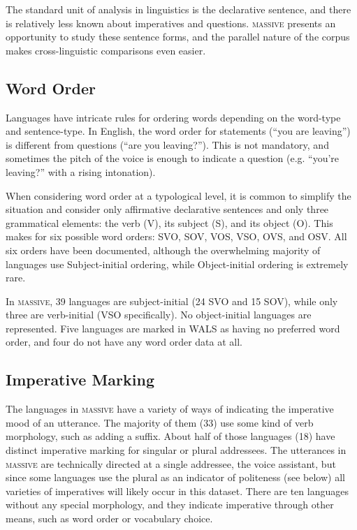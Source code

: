 \documentclass[11pt]{article}
\newcommand{\M}{\textsc{massive}}
\begin{document}
The standard unit of analysis in linguistics is the declarative sentence, and there is relatively less known about imperatives and questions.
\M{} presents an opportunity to study these sentence forms, and the parallel nature of the corpus makes cross-linguistic comparisons even easier.

\subsection{Word Order} \label{sect:WordOrder}

Languages have intricate rules for ordering words depending on the word-type and  sentence-type.
In English, the word order for statements (``you are leaving'') is different from questions (``are you leaving?'').
This is not mandatory, and sometimes the pitch of the voice is enough to indicate a question (e.g. ``you're leaving?'' with a rising intonation).

When considering word order at a typological level, it is common to simplify the situation and consider only affirmative declarative sentences and only three grammatical elements: the verb (V), its subject (S), and its object (O).
This makes for six possible word orders: SVO, SOV, VOS, VSO, OVS, and OSV.
All six orders have been documented, although the overwhelming majority of languages use Subject-initial ordering, while Object-initial ordering is extremely rare.

In \M{}, 39 languages are subject-initial (24 SVO and 15 SOV), while only three are verb-initial (VSO specifically).
No object-initial languages are represented.
Five languages are marked in WALS as having no preferred word order, and four do not have any word order data at all.

\subsection{Imperative Marking} \label{sect:ImperativeMarking}

The languages in \M{} have a variety of ways of indicating the imperative mood of an utterance.
The majority of them (33) use some kind of verb morphology, such as adding a suffix.
About half of those languages (18) have distinct imperative marking for singular or plural addressees.
The utterances in \M{} are technically directed at a single addressee, the voice assistant, but since some languages use the plural as an indicator of politeness (see below) all varieties of imperatives will likely occur in this dataset.
There are ten languages without any special morphology, and they indicate imperative through other means, such as word order or vocabulary choice.
\end{document}
